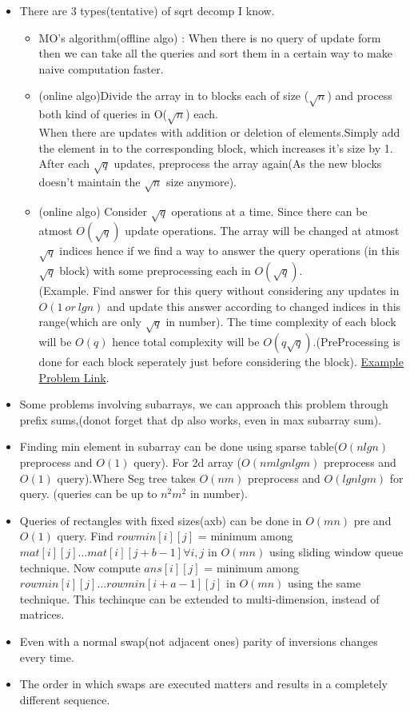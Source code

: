 \documentclass[../Notes.tex]{subfiles}
\begin{document}
\begin{itemize}
	\item There are 3 types(tentative) of sqrt decomp I know.
	\begin{itemize}
		\item MO's algorithm(offline algo) : When there is no query of update form then we can take all the queries and sort them in a certain way to make naive computation faster.
		\item (online algo)Divide the array in to blocks each of size ($\sqrt{n}$) and process both kind of queries in O($\sqrt{n}$) each.\\
		When there are updates with addition or deletion of elements.Simply add the element in to the corresponding block, which increases it's size by 1. After each $\sqrt{q}$ updates, preprocess the array again(As the new blocks doesn't maintain the $\sqrt{n}$ size anymore).
		\item (online algo) Consider $\sqrt{q}$ operations at a time. Since there can be atmost $O(\sqrt{q})$ update operations. The array will be changed at atmost $\sqrt{q}$ indices hence if we find a way to answer the query operations (in this $\sqrt{q}$ block) with some preprocessing each in $O(\sqrt{q})$.\\
		 (Example. Find answer for this query without considering any updates in $O(1 \: or \: lgn)$ and update this answer according to changed indices in this range(which are only $\sqrt{q}$ in number). The time complexity of each block will be $O(q)$ hence total complexity will be $O(q\sqrt{q})$.(PreProcessing is done for each block seperately just before considering the block). \href{https://codeforces.com/problemset/problem/785/E}{Example Problem Link}.
	\end{itemize}
	\item Some problems involving subarrays, we can approach this problem through prefix sums,(donot forget that dp also works, even in max subarray sum). 
	\item Finding min element in subarray can be done using sparse table($O(nlgn)$ preprocess and $O(1)$ query). For 2d array ($O(nmlgnlgm)$ preprocess and $O(1)$ query).Where Seg tree takes $O(nm)$ preprocess and $O(lgnlgm)$ for query. (queries can be up to $n^2m^2$ in number).
	\item Queries of rectangles with fixed sizes(axb) can be done in $O(mn)$ pre and $O(1)$ query. Find $rowmin[i][j]$ = minimum among $mat[i][j]\ldots mat[i][j+b-1] \forall i,j$ in $O(mn)$ using sliding window queue technique. Now compute $ans[i][j]$ = minimum among $rowmin[i][j]\ldots rowmin[i+a-1][j]$ in $O(mn)$ using the same technique. This techinque can be extended to multi-dimension, instead of matrices.
	\item Even with a normal swap(not adjacent ones) parity of inversions changes every time.
	\item The order in which swaps are executed matters and results in a completely different sequence.
\end{itemize}
\end{document}

